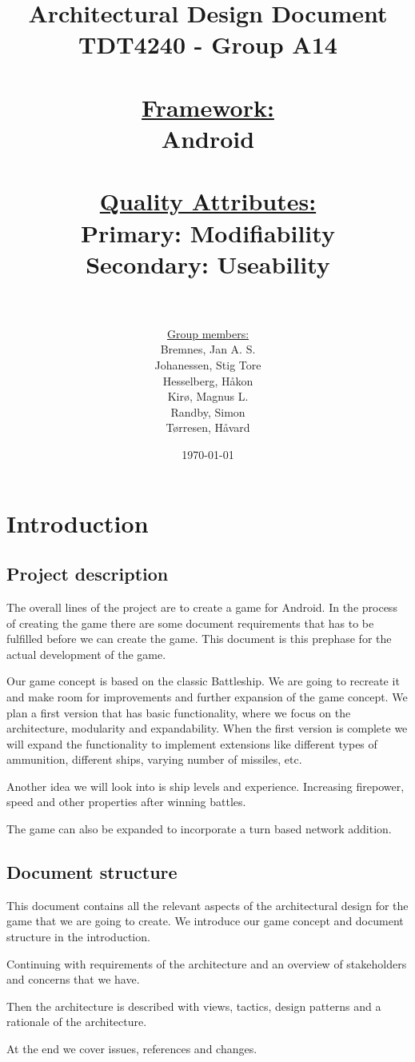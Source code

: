 \documentclass[12pt, a4paper]{article}
\title{
	Architectural Design Document \\
    TDT4240 - Group A14 \\
	~\\
	\normalsize{
	\underline{Framework:} \\ 
	Android\\
    ~\\
	\underline{Quality Attributes:} \\
	Primary: Modifiability \\
	Secondary: Useability \\ 
    ~\\
	}
}
\author{
	\underline{Group members:} \\
    Bremnes, Jan A. S.\\
    Johanessen, Stig Tore\\
	Hesselberg, Håkon \\
    Kirø, Magnus L.\\
	Randby, Simon \\
    Tørresen, Håvard\\
}
\date{\today}
\begin{document}
\maketitle
{}

\newpage
\tableofcontents
\newpage

\section{Introduction}

\subsection{Project description}
The overall lines of the project are to create a game for Android. In the process of creating the game there are some document requirements that has to be fulfilled before we can create the game. This document is this prephase for the actual development of the game. 

Our game concept is based on the classic Battleship. We are going to recreate it and make room for improvements and further expansion of the game concept. We plan a first version that has basic functionality, where we focus on the architecture, modularity and expandability. When the first version is complete we will expand the functionality to implement extensions like different types of ammunition, different ships, varying number of missiles, etc. 

Another idea we will look into is ship levels and experience. Increasing firepower, speed and other properties after winning battles. 

The game can also be expanded to incorporate a turn based network addition. 

\subsection{Document structure}
This document contains all the relevant aspects of the architectural design for the game that we are going to create. We introduce our game concept and document structure in the introduction. 

Continuing with requirements of the architecture and an overview of stakeholders and concerns that we have. 

Then the architecture is described with views, tactics, design patterns and a rationale of the architecture.

At the end we cover issues, references and changes. 
\end{document}
